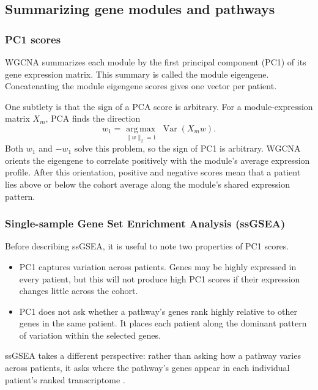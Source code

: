 \documentclass[11pt]{article}
\begin{document}
\subsection{Summarizing gene modules and pathways}

\subsubsection{PC1 scores}

WGCNA summarizes each module by the first principal component (PC1) of its gene
expression matrix. This summary is called the module eigengene. Concatenating
the module eigengene scores gives one vector per patient.

One subtlety is that the sign of a PCA score is arbitrary. For a
module-expression
matrix $X_m$, PCA finds the direction
\begin{equation}
    w_1 = \underset{\lVert w\rVert_2=1}{\operatorname{arg\,max}}
    \;\operatorname{Var}(X_m w).
\end{equation}
Both $w_1$ and $-w_1$ solve this problem, so the sign of PC1 is arbitrary.
WGCNA orients the eigengene to correlate positively with the module's average
expression profile. After this orientation, positive and negative scores mean
that a patient lies above or below the cohort average along the module's shared
expression pattern.

\subsubsection{Single-sample Gene Set Enrichment Analysis (ssGSEA)}

Before describing ssGSEA, it is useful to note two properties of PC1 scores.

\begin{itemize}
    \item PC1 captures variation across patients. Genes may be highly expressed
    in every patient, but this will not produce high PC1 scores if their
    expression changes little across the cohort.
    \item PC1 does not ask whether a pathway's genes rank highly relative to
    other genes in the same patient. It places each patient along the dominant
    pattern of variation within the selected genes.
\end{itemize}

ssGSEA takes a different perspective: rather than asking how a pathway varies
across patients, it asks where the pathway's genes appear in each individual
patient's ranked transcriptome \cite{barbie2009systematic}.
\end{document}
